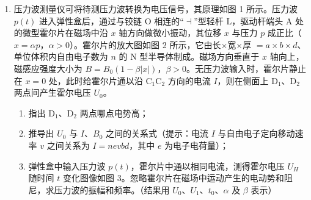 \documentclass[\gkver]{gaokaozhenti}
\begin{document}
\begin{enumerate}
{	（2）此实验类似于双缝干涉，只是此时“双缝”之间的距离 $d=2h$，由双缝干涉条纹间距公式 $\Delta x=\frac{l}{d}\lambda$ 可得 $\Delta x=\frac{D}{2h}\lambda$。若撤去平面镜，在单缝下方再放置另一单缝，虽然有两个点光源（两个双缝类似于点光源），但由于缺少单缝不能形成稳定的相干光，故无法观察到干涉条纹。
}

\item
压力波测量仪可将待测压力波转换为电压信号，其原理如图 1 所示。压力波 $p(t)$ 进入弹性盒后，通过与铰链 O 相连的“$\dashv$”型轻杆 L，驱动杆端头 A 处的微型霍尔片在磁场中沿 $x$ 轴方向做微小振动，其位移 $x$ 与压力 $p$ 成正比（$x=\alpha p$，$\alpha>0$）。霍尔片的放大图如图 2 所示，它由长$\times$宽$\times$厚 $=a\times b\times d$、单位体积内自由电子数为 $n$ 的 N 型半导体制成。磁场方向垂直于 $x$ 轴向上，磁感应强度大小为 $B=B_{0}(1-\beta|x|)$，$\beta>0$。无压力波输入时，霍尔片静止在 $x=0$ 处，此时给霍尔片通以沿 C$_{1}$C$_{2}$ 方向的电流 $I$，则在侧面上 D$_{1}$、D$_{2}$ 两点间产生霍尔电压 $U_{0}$。
\begin{enumerate}
	\item
	指出 D$_{1}$、D$_{2}$ 两点哪点电势高；
	\item
	推导出 $U_{0}$ 与 $I$、$B_{0}$ 之间的关系式（提示：电流 $I$ 与自由电子定向移动速率 $v$ 之间关系为 $I=nevbd$，其中 $e$ 为电子电荷量）；
	\item
	弹性盒中输入压力波 $p(t)$，霍尔片中通以相同电流，测得霍尔电压 $U_{H}$ 随时间 $t$ 变化图像如图 3。忽略霍尔片在磁场中运动产生的电动势和阻尼，求压力波的振幅和频率。（结果用 $U_{0}$、$U_{1}$、$t_{0}$、$\alpha$ 及 $\beta$ 表示）
\end{enumerate}
\end{enumerate}
\end{document}
